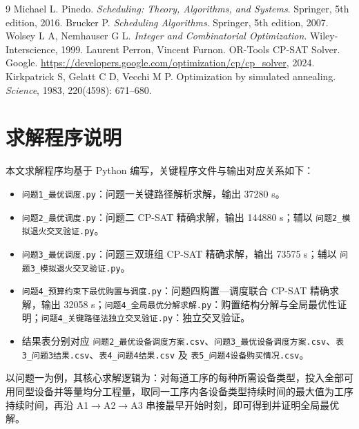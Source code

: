 \documentclass[12pt,a4paper]{article}
\begin{document}
\begin{thebibliography}{9}
Michael L. Pinedo. \textit{Scheduling: Theory, Algorithms, and Systems}. Springer, 5th edition, 2016.
Brucker P. \textit{Scheduling Algorithms}. Springer, 5th edition, 2007.
Wolsey L A, Nemhauser G L. \textit{Integer and Combinatorial Optimization}. Wiley-Interscience, 1999.
Laurent Perron, Vincent Furnon. OR-Tools CP-SAT Solver. Google. \url{https://developers.google.com/optimization/cp/cp_solver}, 2024.
Kirkpatrick S, Gelatt C D, Vecchi M P. Optimization by simulated annealing. \textit{Science}, 1983, 220(4598): 671--680.
\end{thebibliography}

\appendix
\section{求解程序说明}

本文求解程序均基于 Python 编写，关键程序文件与输出对应关系如下：

\begin{itemize}
  \item \texttt{问题1\_最优调度.py}：问题一关键路径解析求解，输出 37280 s。
  \item \texttt{问题2\_最优调度.py}：问题二 CP-SAT 精确求解，输出 144880 s；辅以 \texttt{问题2\_模拟退火交叉验证.py}。
  \item \texttt{问题3\_最优调度.py}：问题三双班组 CP-SAT 精确求解，输出 73575 s；辅以 \texttt{问题3\_模拟退火交叉验证.py}。
  \item \texttt{问题4\_预算约束下最优购置与调度.py}：问题四购置—调度联合 CP-SAT 精确求解，输出 32058 s；\texttt{问题4\_全局最优分解求解.py}：购置结构分解与全局最优性证明；\texttt{问题4\_关键路径法独立交叉验证.py}：独立交叉验证。
  \item 结果表分别对应 \texttt{问题2\_最优设备调度方案.csv}、\texttt{问题3\_最优设备调度方案.csv}、\texttt{表3\_问题3结果.csv}、\texttt{表4\_问题4结果.csv} 及 \texttt{表5\_问题4设备购买情况.csv}。
\end{itemize}

以问题一为例，其核心求解逻辑为：对每道工序的每种所需设备类型，投入全部可用同型设备并等量均分工程量，取同一工序内各设备类型持续时间的最大值为工序持续时间，再沿 A1$\to$A2$\to$A3 串接最早开始时刻，即可得到并证明全局最优解。
\end{document}
